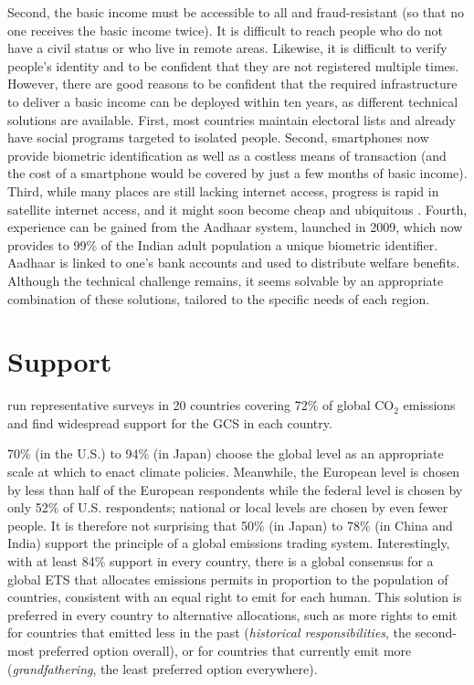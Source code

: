 \documentclass[12pt,english]{article}
\begin{document}
Second, the basic income must be accessible to all and fraud-resistant (so that no one receives the basic income twice). It is difficult to reach people who do not have a civil status or who live in remote areas. Likewise, it is difficult to verify people's identity and to be confident that they are not registered multiple times. However, there are good reasons to be confident that the required infrastructure to deliver a basic income can be deployed within ten years, as different technical solutions are available. First, most countries maintain electoral lists and already have social programs targeted to isolated people. Second, smartphones now provide biometric identification as well as a costless means of transaction (and the cost of a smartphone would be covered by just a few months of basic income). Third, while many places are still lacking internet access, progress is rapid in satellite internet access, and it might soon become cheap and ubiquitous \citep{hanson_satellite_2016}. Fourth, experience can be gained from the Aadhaar system, launched in 2009, which now provides to 99\% of the Indian adult population a unique biometric identifier. Aadhaar is linked to one's bank accounts and used to distribute welfare benefits. Although the technical challenge remains, it seems solvable by an appropriate combination of these solutions, tailored to the specific needs of each region. 

\section{Support}\label{sec:support}

\citet{fabre_international_2023} run representative surveys in 20 countries covering 72\% of global CO$_\text{2}$ emissions and find widespread support for the GCS in each country. 

70\% (in the U.S.) to 94\% (in Japan) choose the global level as an appropriate scale at which to enact climate policies. Meanwhile, the European level is chosen by less than half of the European respondents while the federal level is chosen by only 52\% of U.S. respondents; national or local levels are chosen by even fewer people. It is therefore not surprising that 50\% (in Japan) to 78\% (in China and India) %
support the principle of a global emissions trading system. 
Interestingly, with at least 84\% support in every country, %
there is a global consensus for a global ETS that allocates emissions permits in proportion to the population of countries, consistent with an equal right to emit for each human. This solution is preferred in every country to alternative allocations, such as more rights to emit for countries that emitted less in the past (\textit{historical responsibilities}, the second-most preferred option overall), or for countries that currently emit more (\textit{grandfathering}, the least preferred option everywhere). 
\end{document}
